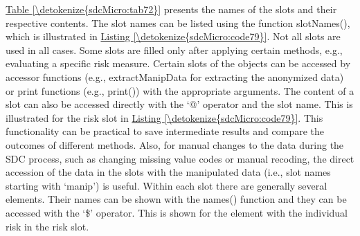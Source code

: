 \documentclass[letterpaper,10pt,english]{sphinxmanual}
\begin{document}
\hyperref[\detokenize{sdcMicro:tab72}]{Table \ref{\detokenize{sdcMicro:tab72}}} presents the names of the slots and their respective contents.
The slot names can be listed using the function slotNames(), which is
illustrated in \hyperref[\detokenize{sdcMicro:code79}]{Listing \ref{\detokenize{sdcMicro:code79}}}. Not all slots are used in all cases. Some
slots are filled only after applying certain methods, e.g., evaluating a
specific risk measure. Certain slots of the objects can be accessed by
accessor functions (e.g., extractManipData for extracting the anonymized
data) or print functions (e.g., print()) with the appropriate arguments.
The content of a slot can also be accessed directly with the ‘@’
operator and the slot name. This is illustrated for the risk slot in
\hyperref[\detokenize{sdcMicro:code79}]{Listing \ref{\detokenize{sdcMicro:code79}}}. This functionality can be practical to save intermediate
results and compare the outcomes of different methods. Also, for manual
changes to the data during the SDC process, such as changing missing
value codes or manual recoding, the direct accession of the data in the
slots with the manipulated data (i.e., slot names starting with ‘manip’)
is useful. Within each slot there are generally several elements. Their
names can be shown with the names() function and they can be accessed
with the ‘\$’ operator. This is shown for the element with the individual
risk in the risk slot.
\end{document}
